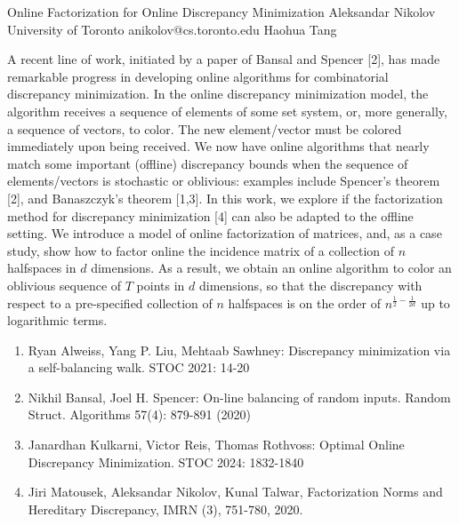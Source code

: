 \begin{talk}
  {Online Factorization for Online Discrepancy Minimization}%
  {Aleksandar Nikolov}%
  {University of Toronto}%
  {anikolov@cs.toronto.edu}%
  {Haohua Tang}%
  
    
   
A recent line of work, initiated by a paper of Bansal and Spencer [2], has made remarkable progress in developing online algorithms for combinatorial discrepancy minimization. In the online discrepancy minimization model, the algorithm receives a sequence of elements of some set system, or, more generally, a sequence of vectors, to color. The new element/vector must be colored immediately upon being received. We now have online algorithms that nearly match some important (offline) discrepancy bounds when the sequence of elements/vectors is stochastic or oblivious: examples include Spencer's theorem [2], and Banaszczyk's theorem [1,3]. In this work, we explore if the factorization method for discrepancy minimization [4] can also be adapted to the offline setting. We introduce a model of online factorization of matrices, and, as a case study, show how to factor online the incidence matrix of a collection of $n$ halfspaces in $d$ dimensions. As a result, we obtain an online algorithm to color an oblivious sequence of $T$ points in $d$ dimensions, so that the discrepancy with respect to a pre-specified collection of $n$ halfspaces is on the order of $n^{\frac12 - \frac{1}{2d}}$ up to logarithmic terms. 

\medskip

\begin{enumerate}
    \item[{[1]}] Ryan Alweiss, Yang P. Liu, Mehtaab Sawhney:
Discrepancy minimization via a self-balancing walk. STOC 2021: 14-20

 \item[{[2]}] Nikhil Bansal, Joel H. Spencer:
On-line balancing of random inputs. Random Struct. Algorithms 57(4): 879-891 (2020)

    \item[{[3]}] Janardhan Kulkarni, Victor Reis, Thomas Rothvoss:
Optimal Online Discrepancy Minimization. STOC 2024: 1832-1840

    \item[{[4]}] Jiri Matousek, Aleksandar Nikolov, Kunal Talwar, Factorization Norms and Hereditary Discrepancy, IMRN (3), 751-780, 2020. 

\end{enumerate}
\end{talk}
